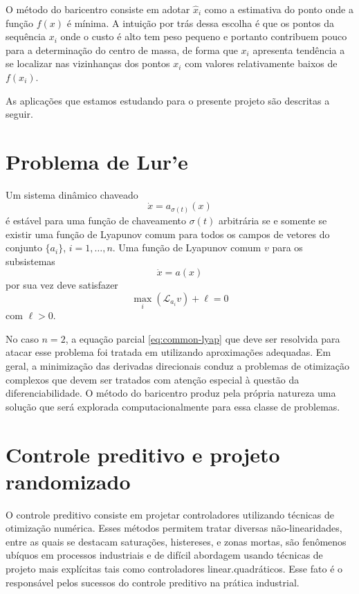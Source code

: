 \documentclass{tufte-handout}
\def\Lie{\mathcal{L}}
\begin{document}
O método do baricentro consiste em adotar $\hat{x}_i$ como a estimativa do ponto onde a função $f(x)$ é mínima. A intuição por trás dessa escolha é que os pontos da sequência $x_i$ onde o custo é alto tem peso pequeno e portanto contribuem pouco para a determinação do centro de massa, de forma que $x_i$ apresenta  tendência a se localizar nas vizinhanças dos pontos $x_i$ com valores relativamente baixos de $f(x_i)$.




As aplicações que estamos estudando para o presente projeto são descritas a seguir.

\section{Problema de Lur'e}

Um  sistema dinâmico chaveado 
\begin{equation}
\label{eq:sys-set}
\dot{x} =     a_{\sigma(t)}(x) 
\end{equation}
é estável para uma função de chaveamento $\sigma(t)$ arbitrária se e somente se existir uma função de Lyapunov comum para todos os campos de vetores do conjunto $\{a_i\}$, $i=1,\ldots,n$. 
%
Uma função de Lyapunov comum  $v$ para  os subsistemas
\begin{equation}
 \dot{x} =     a(x)
  \end{equation} 
  \label{eq:common-lyap}
 por sua vez deve satisfazer
 \begin{equation}
\label{eqmax}
\max_{i}(\Lie_{a_i} v) + \ell = 0
\end{equation}
com $\ell >0$. 

No caso $n=2$, a equação parcial \eqref{eq:common-lyap} que deve ser resolvida para atacar esse problema foi tratada em \cite{cba2012} utilizando aproximações adequadas. Em geral, a minimização das derivadas direcionais conduz a problemas de otimização complexos que devem ser tratados com atenção especial à questão da diferenciabilidade. O método do baricentro produz pela própria natureza uma solução que será explorada computacionalmente para essa classe de problemas.




\section{Controle preditivo e projeto randomizado}

O controle preditivo consiste em projetar controladores utilizando técnicas de otimização numérica. Esses métodos permitem tratar diversas não-linearidades, entre as quais se destacam saturações, histereses, e zonas mortas,  são fenômenos ubíquos em processos industriais e de difícil abordagem usando técnicas de projeto mais explícitas tais como controladores linear.quadráticos. Esse fato é o responsável pelos sucessos do controle preditivo na prática industrial. 
\end{document}
